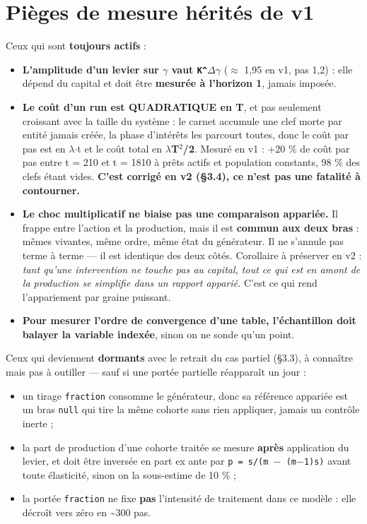 \documentclass[11pt,a4paper]{article}
\newcommand{\code}[1]{\texttt{#1}}
\begin{document}
\bigskip

\setcounter{section}{12}
\section{Pièges de mesure hérités de v1}

Ceux qui sont \textbf{toujours actifs} :

\begin{itemize}
\item \textbf{L'amplitude d'un levier sur \ensuremath{\gamma} vaut \code{K\textasciicircum{}\ensuremath{\Delta}\ensuremath{\gamma}}} (\ensuremath{\approx} 1,95 en v1, pas 1,2) : elle dépend du capital et doit être \textbf{mesurée à l'horizon 1}, jamais imposée.
\item \textbf{Le coût d'un run est QUADRATIQUE en T}, et pas seulement croissant avec la taille du système : le carnet accumule une clef morte par entité jamais créée, la phase d'intérêts les parcourt toutes, donc le coût par pas est en \ensuremath{\lambda}\ensuremath{\cdot}t et le coût total en \textbf{\ensuremath{\lambda}T\ensuremath{^2}/2}. Mesuré en v1 : +20 \% de coût par pas entre t = 210 et t = 1810 à prêts actifs et population constants, 98 \% des clefs étant vides. \textbf{C'est corrigé en v2 (§3.4), ce n'est pas une fatalité à contourner.}
\item \textbf{Le choc multiplicatif ne biaise pas une comparaison appariée.} Il frappe entre l'action et la production, mais il est \textbf{commun aux deux bras} : mêmes vivantes, même ordre, même état du générateur. Il ne s'annule pas terme à terme --- il est identique des deux côtés. Corollaire à préserver en v2 : \emph{tant qu'une intervention ne touche pas au capital, tout ce qui est en amont de la production se simplifie dans un rapport apparié.} C'est ce qui rend l'appariement par graine puissant.
\item \textbf{Pour mesurer l'ordre de convergence d'une table, l'échantillon doit balayer la variable indexée}, sinon on ne sonde qu'un point.
\end{itemize}

Ceux qui deviennent \textbf{dormants} avec le retrait du cas partiel (§3.3), à connaître mais pas à outiller --- sauf si une portée partielle réapparaît un jour :

\begin{itemize}
\item un tirage \code{fraction} consomme le générateur, donc sa référence appariée est un bras \code{null} qui tire la même cohorte sans rien appliquer, jamais un contrôle inerte ;
\item la part de production d'une cohorte traitée se mesure \textbf{après} application du levier, et doit être inversée en part ex ante par \code{p = s/(m \ensuremath{-} (m\ensuremath{-}1)s)} avant toute élasticité, sinon on la sous-estime de 10 \% ;
\item la portée \code{fraction} ne fixe \textbf{pas} l'intensité de traitement dans ce modèle : elle décroît vers zéro en \textasciitilde{}300 pas.
\end{itemize}
\end{document}
